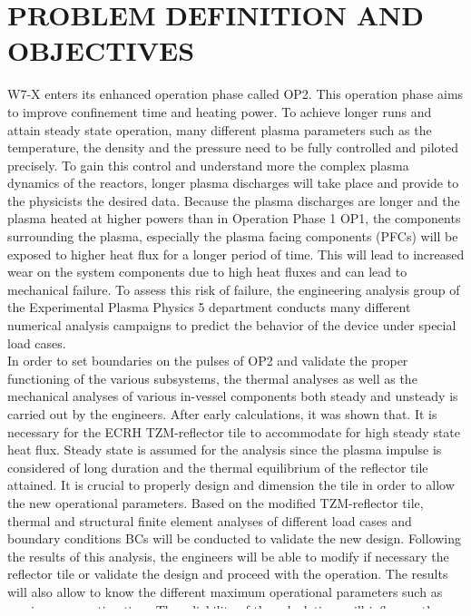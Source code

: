 \section{PROBLEM DEFINITION AND OBJECTIVES}
\normalsize{W7-X enters its enhanced operation phase called \acrshort{OP2}. This operation phase aims to improve confinement time and heating power. To achieve longer runs and attain steady state operation, many different plasma parameters such as the temperature, the density and the pressure need to be fully controlled and piloted precisely. To gain this control and understand more the complex plasma dynamics of the reactors, longer plasma discharges will take place and provide to the physicists the desired data. Because the plasma discharges are longer and the plasma heated at higher powers than in Operation Phase 1 \acrshort{OP1}, the components surrounding the plasma, especially the plasma facing components (\acrshort{PFCs}) will be exposed to higher heat flux for a longer period of time. This will lead to increased wear on the system components due to high heat fluxes and can lead to mechanical failure. To assess this risk of failure, the engineering analysis group of the Experimental Plasma Physics 5 department conducts many different numerical analysis campaigns to predict the behavior of the device under special load cases.}
\\
\break
\normalsize{\indent In order to set boundaries on the pulses of \acrshort{OP2} and validate the proper functioning of the various subsystems, the thermal analyses as well as the mechanical analyses of various in-vessel components both steady and unsteady is carried out by the engineers. After early calculations, it was shown that. It is necessary for the ECRH TZM-reflector tile to accommodate for high steady state heat flux. Steady state is assumed for the analysis since the plasma impulse is considered of long duration and the thermal equilibrium of the reflector tile attained. It is crucial to properly design and dimension the tile in order to allow the new operational parameters. Based on the modified TZM-reflector tile, thermal and structural finite element analyses of different load cases and boundary conditions \acrshort{BCs} will be conducted to validate the new design. Following the results of this analysis, the engineers will be able to modify if necessary the reflector tile or validate the design and proceed with the operation. The results will also allow to know the different maximum operational parameters such as maximum operation time. The reliability of the calculations will influence the decision made and thus needs to be estimated to avoid any significant error between the FE model and the real life behavior.}
